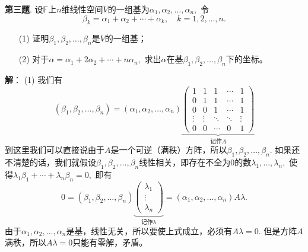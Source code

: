 \newpageorvspace

{\bf 第三题}. 设$\mathbb{F}$上$n$维线性空间$V$的一组基为$\alpha_1, \alpha_2, \ldots, \alpha_n,$ 令
$$\beta_k = \alpha_1 + \alpha_2 + \cdots + \alpha_k, \quad k = 1, 2, \ldots, n.$$
\begin{itemize}
\item[(1)] 证明$\beta_1, \beta_2, \ldots, \beta_n$是$V$的一组基；
\item[(2)] 对于$\alpha = \alpha_1 + 2 \alpha_2 + \cdots + n \alpha_n,$ 求出$\alpha$在基$\beta_1, \beta_2, \ldots, \beta_n$下的坐标。
\end{itemize}

\newpageorvspace

{\bf 解}： (1) 我们有
$$(\beta_1, \beta_2, \ldots, \beta_n) = (\alpha_1, \alpha_2, \ldots, \alpha_n) \underbrace{ \begin{pmatrix} 1 & 1 & 1 & \cdots & 1 \\ 0 & 1 & 1 & \cdots & 1 \\ 0 & 0 & 1 & \cdots & 1 \\ \vdots & \vdots & \ddots & \ddots & \vdots \\ 0 & 0 & \cdots & 0 & 1 \end{pmatrix} }_{\text{记作} A}$$
到这里我们可以直接说由于$A$是一个可逆（满秩）方阵，所以$\beta_1, \beta_2, \ldots, \beta_n.$ 如果还不清楚的话，我们就假设$\beta_1, \beta_2, \ldots, \beta_n$线性相关，即存在不全为0的数$\lambda_1, \ldots, \lambda_n,$ 使得$\lambda_1 \beta_1 + \cdots + \lambda_n \beta_n = 0,$ 即有
$$0 = (\beta_1, \beta_2, \ldots, \beta_n) \underbrace{ \begin{pmatrix} \lambda_1 \\ \vdots \\ \lambda_n \end{pmatrix} }_{\text{记作} \lambda} = (\alpha_1, \alpha_2, \ldots, \alpha_n) A \lambda.$$
由于$\alpha_1, \alpha_2, \ldots, \alpha_n$是基，线性无关，所以要使上式成立，必须有$A\lambda = 0.$ 但是方阵$A$满秩，所以$A\lambda = 0$只能有零解，矛盾。

